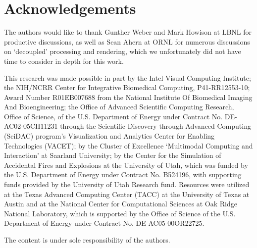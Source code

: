 \section*{Acknowledgements}

The authors would like to thank Gunther Weber and Mark Howison at
LBNL for productive discussions, as well as Sean Ahern at ORNL for
numerous discussions on `decoupled' processing and rendering, which we
unfortunately did not have time to consider in depth for this work.

This research was made possible in part by the Intel Visual
Computing Institute; the NIH/NCRR Center for Integrative Biomedical
Computing, P41-RR12553-10; Award Number R01EB007688 from the National
Institute Of Biomedical Imaging And Bioengineering; the Office of
Advanced Scientific Computing Research, Office of Science, of the
U.S. Department of Energy under Contract No. DE-AC02-05CH11231
through the Scientific Discovery through Advanced Computing (SciDAC)
program's Visualization and Analytics Center for Enabling Technologies
(VACET); by the Cluster of Excellence `Multimodal Computing and
Interaction' at Saarland University; by the Center for the Simulation
of Accidental Fires and Explosions at the University of Utah, which was
funded by the U.S. Department of Energy under Contract No. B524196,
with supporting funds provided by the University of Utah Research
fund. Resources were utilized at the Texas Advanced Computing Center
(TACC) at the University of Texas at Austin and at the National Center
for Computational Sciences at Oak Ridge National Laboratory, which is
supported by the Office of Science of the U.S. Department of Energy
under Contract No. DE-AC05-00OR22725.

The content is under sole responsibility of the authors.

